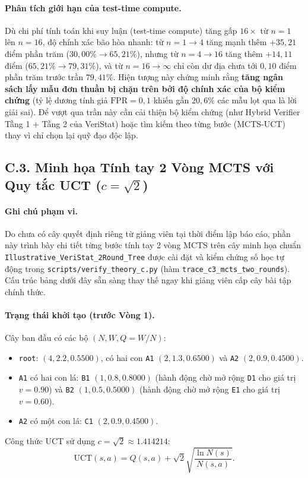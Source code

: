 \paragraph{Phân tích giới hạn của test-time compute.}
Dù chi phí tính toán khi suy luận (test-time compute) tăng gấp $16\times$ từ $n = 1$ lên $n = 16$, độ chính xác bão hòa nhanh: từ $n = 1 \to 4$ tăng mạnh thêm $+35{,}21$ điểm phần trăm ($30{,}00\% \to 65{,}21\%$), nhưng từ $n = 4 \to 16$ tăng thêm $+14{,}11$ điểm ($65{,}21\% \to 79{,}31\%$), và từ $n = 16 \to \infty$ chỉ còn dư địa chưa tới $0{,}10$ điểm phần trăm trước trần $79{,}41\%$. Hiện tượng này chứng minh rằng \textbf{tăng ngân sách lấy mẫu đơn thuần bị chặn trên bởi độ chính xác của bộ kiểm chứng} (tỷ lệ dương tính giả $\text{FPR} = 0{,}1$ khiến gần $20{,}6\%$ các mẫu lọt qua là lời giải sai). Để vượt qua trần này cần cải thiện bộ kiểm chứng (như Hybrid Verifier Tầng 1 + Tầng 2 của VeriStat) hoặc tìm kiếm theo từng bước (MCTS-UCT) thay vì chỉ chọn lại quỹ đạo độc lập.

\subsection{C.3. Minh họa Tính tay 2 Vòng MCTS với Quy tắc UCT ($c = \sqrt{2}$)}
\label{subsec:c3}

\paragraph{Ghi chú phạm vi.}
Do chưa có cây quyết định riêng từ giảng viên tại thời điểm lập báo cáo, phần này trình bày chi tiết từng bước tính tay 2 vòng MCTS trên cây minh họa chuẩn \texttt{Illustrative\_VeriStat\_2Round\_Tree} được cài đặt và kiểm chứng số học tự động trong \texttt{scripts/verify\_theory\_c.py} (hàm \texttt{trace\_c3\_mcts\_two\_rounds}). Cấu trúc bảng dưới đây sẵn sàng thay thế ngay khi giảng viên cấp cây bài tập chính thức.

\paragraph{Trạng thái khởi tạo (trước Vòng 1).}
Cây ban đầu có các bộ $(N, W, Q = W/N)$:
\begin{itemize}
  \item \texttt{root}: $(4, 2.2, 0.5500)$, có hai con \texttt{A1} $(2, 1.3, 0.6500)$ và \texttt{A2} $(2, 0.9, 0.4500)$.
  \item \texttt{A1} có hai con lá: \texttt{B1} $(1, 0.8, 0.8000)$ (hành động chờ mở rộng \texttt{D1} cho giá trị $v = 0.90$) và \texttt{B2} $(1, 0.5, 0.5000)$ (hành động chờ mở rộng \texttt{E1} cho giá trị $v = 0.60$).
  \item \texttt{A2} có một con lá: \texttt{C1} $(2, 0.9, 0.4500)$.
\end{itemize}
Công thức UCT sử dụng $c = \sqrt{2} \approx 1.414214$:
\[
  \text{UCT}(s, a) = Q(s, a) + \sqrt{2} \sqrt{\frac{\ln N(s)}{N(s, a)}}.
\]

